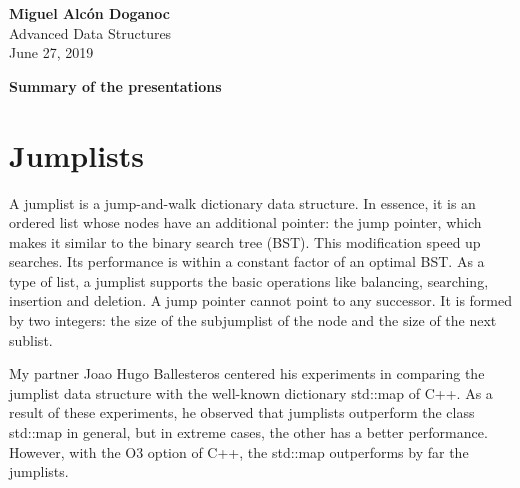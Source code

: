 \documentclass[a4paper, 10pt]{article}
\begin{document}
\noindent
\begin{flushright}
    \large\textbf{Miguel Alcón Doganoc} \\
    Advanced Data Structures \\
	June 27, 2019
\end{flushright}

\noindent
{\huge{\textbf{Summary of the presentations}}}
\section{Jumplists}

A jumplist is a jump-and-walk dictionary data structure. In essence, it is an ordered list whose nodes have an additional pointer: the jump pointer, which makes it similar to the binary search tree (BST). This modification speed up searches. Its performance is within a constant factor of an optimal BST. As a type of list, a jumplist supports the basic operations like balancing, searching, insertion and deletion. A jump pointer cannot point to any successor. It is formed by two integers: the size of the subjumplist of the node and the size of the next sublist.

My partner Joao Hugo Ballesteros centered his experiments in comparing the jumplist data structure with the well-known dictionary std::map of C++. As a result of these experiments, he observed that jumplists outperform the class std::map in general, but in extreme cases, the other has a better performance. However, with the O3 option of C++, the std::map outperforms by far the jumplists.



\end{document}
